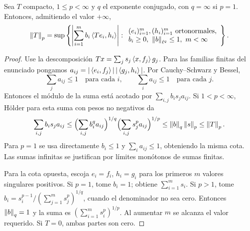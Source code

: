 \begin{lema}\label{v3:schatten-variacional}
Sea $T$ compacto, $1\le p<\infty$ y $q$ el exponente conjugado, con $q=\infty$ si $p=1$. Entonces, admitiendo el valor $+\infty$,
\[\left\lVert T\right\rVert_p=
\sup\left\{\left|\sum_{i=1}^m b_i\left\langle Te_i,h_i\right\rangle\right|:
\begin{array}{l}(e_i)_{i=1}^m,(h_i)_{i=1}^m\text{ ortonormales},\\
b_i\ge0,\ \left\lVert b\right\rVert_{\ell^q}\le1,\ m<\infty
\end{array}\right\}.
\]
\end{lema}
\begin{proof}
Use la descomposición $Tx=\sum_js_j\left\langle x,f_j\right\rangle g_j$. Para las familias finitas del enunciado pongamos
$a_{ij}=|\left\langle e_i,f_j\right\rangle|\,|\left\langle g_j,h_i\right\rangle|$. Por Cauchy--Schwarz y Bessel,
\[\sum_ja_{ij}\le1\quad\text{para cada }i,\qquad
\sum_ia_{ij}\le1\quad\text{para cada }j.
\]
Entonces el módulo de la suma está acotado por $\sum_{i,j}b_is_ja_{ij}$. Si $1<p<\infty$, Hölder para esta suma con pesos no negativos da
\[\sum_{i,j}b_is_ja_{ij}
\le\Bigl(\sum_{i,j}b_i^qa_{ij}\Bigr)^{1/q}
\Bigl(\sum_{i,j}s_j^pa_{ij}\Bigr)^{1/p}
\le\left\lVert b\right\rVert_q\left\lVert s\right\rVert_p\le\left\lVert T\right\rVert_p.
\]
Para $p=1$ se usa directamente $b_i\le1$ y $\sum_i a_{ij}\le1$, obteniendo la misma cota. Las sumas infinitas se justifican por límites monótonos de sumas finitas.

Para la cota opuesta, escoja $e_i=f_i$, $h_i=g_i$ para los primeros $m$ valores singulares positivos. Si $p=1$, tome $b_i=1$; obtiene $\sum_{i=1}^ms_i$. Si $p>1$, tome
$b_i=s_i^{p-1}/(\sum_{j=1}^ms_j^p)^{1/q}$, cuando el denominador no sea cero. Entonces $\left\lVert b\right\rVert_q=1$ y la suma es $(\sum_{i=1}^ms_i^p)^{1/p}$. Al aumentar $m$ se alcanza el valor requerido. Si $T=0$, ambas partes son cero.
\end{proof}

